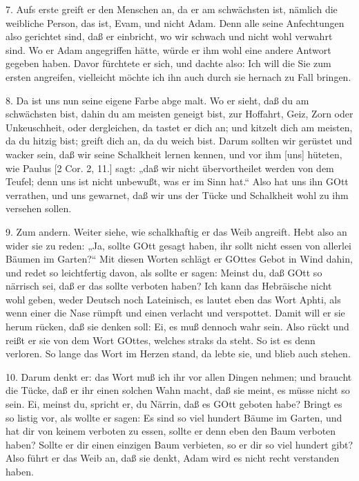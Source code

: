 7. Aufs erste greift er den Menschen an, da er am schwächsten ist, nämlich die weibliche Person, das ist, Evam, und nicht Adam. Denn alle seine Anfechtungen also gerichtet sind, daß er einbricht, wo wir schwach und nicht wohl verwahrt sind. Wo er Adam angegriffen hätte, würde er ihm wohl eine andere Antwort gegeben haben. Davor fürchtete er sich, und dachte also: Ich will die Sie zum ersten angreifen, vielleicht möchte ich ihn auch durch sie hernach zu Fall bringen.

8. Da ist uns nun seine eigene Farbe abge
malt. Wo er sieht, daß du am schwächsten bist, dahin du am meisten geneigt bist, zur Hoffahrt, Geiz, Zorn oder Unkeuschheit, oder dergleichen, da tastet er dich an; und kitzelt dich am meisten, da du hitzig bist; greift dich an, da du weich bist. Darum sollten wir gerüstet und wacker sein, daß wir seine Schalkheit lernen kennen, und vor ihm [uns] hüteten, wie Paulus [2 Cor. 2, 11.] sagt: „daß wir nicht übervortheilet werden von dem Teufel; denn uns ist nicht unbewußt, was er im Sinn hat.“ Also hat uns ihn GOtt verrathen, und uns gewarnet, daß wir uns der Tücke und Schalkheit wohl zu ihm versehen sollen.

9. Zum andern. Weiter siehe, wie schalkhaftig er das Weib angreift. Hebt also an wider sie zu reden: „Ja, sollte GOtt gesagt haben, ihr sollt nicht essen von allerlei Bäumen im Garten?“ Mit diesen Worten schlägt er GOttes Gebot in Wind dahin, und redet so leichtfertig davon, als sollte er sagen: Meinst du, daß GOtt so närrisch sei, daß er das sollte verboten haben? Ich kann das Hebräische nicht wohl geben, weder Deutsch noch Lateinisch, es lautet eben das Wort Aphti, als wenn einer die Nase rümpft und einen verlacht und verspottet. Damit will er sie herum rücken, daß sie denken soll: Ei, es muß dennoch wahr sein. Also rückt und reißt er sie von dem Wort GOttes, welches straks da steht. So ist es denn verloren. So lange das Wort im Herzen stand, da lebte sie, und blieb auch stehen.

10. Darum denkt er: das Wort muß ich ihr vor allen Dingen nehmen; und braucht die Tücke, daß er ihr einen solchen Wahn macht, daß sie meint, es müsse nicht so sein. Ei, meinst du, spricht er, du Närrin, daß es GOtt geboten habe? Bringt es so listig vor, als wollte er sagen: Es sind so viel hundert Bäume im Garten, und hat dir von keinem verboten zu essen, sollte er denn eben den Baum verboten haben? Sollte er dir einen einzigen Baum verbieten, so er dir so viel hundert gibt? Also führt er das Weib an, daß sie denkt, Adam wird es nicht recht verstanden haben.

